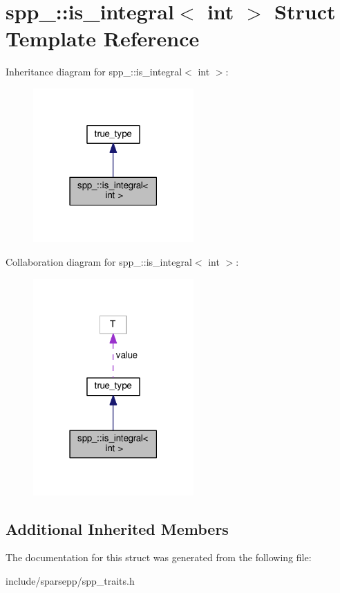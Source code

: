 \hypertarget{structspp___1_1is__integral_3_01int_01_4}{}\section{spp\+\_\+\+:\+:is\+\_\+integral$<$ int $>$ Struct Template Reference}
\label{structspp___1_1is__integral_3_01int_01_4}


Inheritance diagram for spp\+\_\+\+:\+:is\+\_\+integral$<$ int $>$\+:\nopagebreak
\begin{figure}[H]
\begin{center}
\leavevmode
\includegraphics[width=174pt]{structspp___1_1is__integral_3_01int_01_4__inherit__graph}
\end{center}
\end{figure}


Collaboration diagram for spp\+\_\+\+:\+:is\+\_\+integral$<$ int $>$\+:\nopagebreak
\begin{figure}[H]
\begin{center}
\leavevmode
\includegraphics[width=174pt]{structspp___1_1is__integral_3_01int_01_4__coll__graph}
\end{center}
\end{figure}
\subsection*{Additional Inherited Members}


The documentation for this struct was generated from the following file\+:\begin{DoxyCompactItemize}
\item 
include/sparsepp/spp\+\_\+traits.\+h\end{DoxyCompactItemize}
